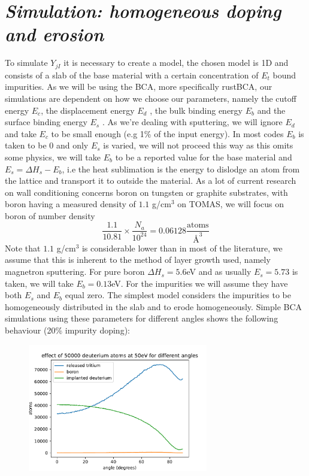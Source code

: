 \documentclass{article}
\begin{document}
\section*{\textit{Simulation: homogeneous doping and erosion}} 
To simulate $Y_{jI}$ it is necessary to create a model, the chosen model is 1D
and consists of a slab of the base material with a certain concentration of
$E_t$ bound impurities. As we will be using the BCA, more specifically
rustBCA\cite{rustBCA}, our simulations are dependent on how we choose our
parameters, namely the cutoff energy $E_c$, the displacement energy $E_d$ , the
bulk binding energy $E_b$ and the surface binding energy $E_s$ \cite{Eckstein}.
As we're dealing with sputtering, we will ignore $E_d$ and take $E_c$ to be
small enough (e.g 1\% of the input energy). In most codes $E_b$ is taken to be
0 and only $E_s$ is varied, we will not proceed this way as this omits some
physics, we will take $E_b$ to be a reported value for the base material and
$E_s = \Delta H_s - E_b$, i.e the heat sublimation is the energy to dislodge an
atom from the lattice and transport it to outside the material. As a lot of current
research on wall conditioning concerns boron on tungsten or graphite
substrates, with boron having a measured density of $1.1$ g/cm$^3$ on TOMAS, we will
focus on boron of number density
\begin{equation}
    \frac{1.1}{10.81}\times \frac{N_a}{10^{24}} = 0.06128 \frac{\text{atoms}}{\text{\AA}^3}
\end{equation}
Note that $1.1$ g/cm$^3$ is considerable lower than in most of the literature, we assume
that this is inherent to the method of layer growth used, namely magnetron sputtering.
For pure boron $\Delta H_s=5.6$eV \cite{BoronSubl} and as usually $E_s = 5.73$ is taken,
we will take $E_b = 0.13$eV.
For the impurities we will assume they have both $E_s$ and $E_b$ equal zero.
The simplest model considers the impurities
to be homogeneously distributed in the slab and to erode homogeneously.
Simple BCA simulations using these parameters for different angles shows the following behaviour (20\% impurity doping):
\begin{figure}[ht]
    \centering
    \includegraphics[width=0.7\textwidth]{figures/detrapex.pdf}
\end{figure}\\
\end{document}
